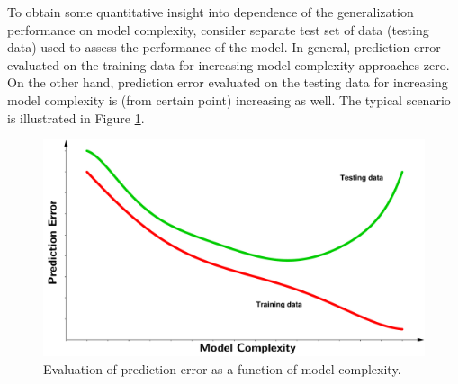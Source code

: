 To obtain some quantitative insight into dependence of the generalization performance on model complexity, consider separate test set of data (testing data) used to assess the performance of the model. 
In general, prediction error evaluated on the training data for increasing model complexity approaches zero. On the other hand, prediction error evaluated on the testing data for increasing model complexity is (from certain point) increasing as well. The typical scenario is illustrated in Figure \ref{fig:Prediction_error}.
 \begin{figure}[h]
	\centering
	\includegraphics[width=16.0cm]{plots/Images/PE3.pdf}
	\caption{Evaluation of prediction error as a function of model complexity.}%
	\label{fig:Prediction_error}%
\end{figure}


 
